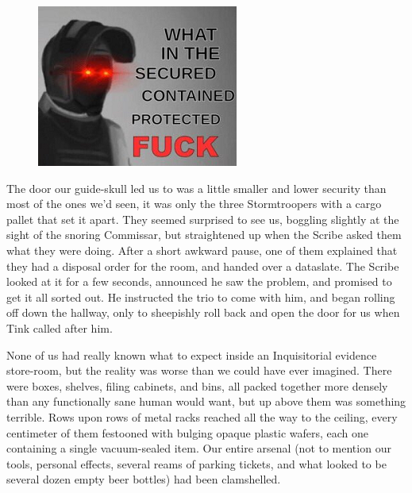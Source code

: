 \begin{figure}
	\begin{center}
		\includegraphics[width=\figwidth]{pics/21/74.png}
	\end{center}
\end{figure}
The door our guide-skull led us to was a little smaller and lower security than most of the ones we'd seen, it was only the three Stormtroopers with a cargo pallet that set it apart. 
They seemed surprised to see us, boggling slightly at the sight of the snoring Commissar, but straightened up when the Scribe asked them what they were doing. 
After a short awkward pause, one of them explained that they had a disposal order for the room, and handed over a dataslate. 
The Scribe looked at it for a few seconds, announced he saw the problem, and promised to get it all sorted out. 
He instructed the trio to come with him, and began rolling off down the hallway, only to sheepishly roll back and open the door for us when Tink called after him. 


None of us had really known what to expect inside an Inquisitorial evidence store-room, but the reality was worse than we could have ever imagined. 
There were boxes, shelves, filing cabinets, and bins, all packed together more densely than any functionally sane human would want, but up above them was something terrible. 
Rows upon rows of metal racks reached all the way to the ceiling, every centimeter of them festooned with bulging opaque plastic wafers, each one containing a single vacuum-sealed item. 
Our entire arsenal (not to mention our tools, personal effects, several reams of parking tickets, and what looked to be several dozen empty beer bottles) had been clamshelled.

